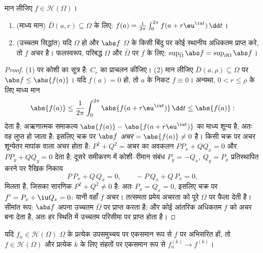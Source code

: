 \begin{theorem}[माध्य मान और उच्चतम मापांक]
\label{thm:b3:holomorphic:maximum}
मान लीजिए $f \in \mathcal H(\Omega)$।
\begin{enumerate}
  \item (माध्य मान) $\bar D(a, r) \subseteq \Omega$ के लिए: $f(a) = \frac1{2\pi}\int_0^{2\pi}f(a +
        r\eu^{\iu t})\,\dd t$।
  \item (उच्चतम सिद्धांत) यदि $\Omega$  हो और $\abs f$ $\Omega$ के
        किसी बिंदु पर कोई स्थानीय अधिकतम प्राप्त करे, तो $f$
        अचर है। फलस्वरूप, परिबद्ध $\Omega$ और $\bar\Omega$ पर  $f$ के
        लिए: $\sup_{\bar\Omega}\abs f =
        \sup_{\partial\Omega}\abs f$।
\end{enumerate}
\end{theorem}

\begin{proof}
(1)  पर कोशी का सूत्र है: $C_r$ का प्राचलन कीजिए।
(2) मान लीजिए $\bar D(a, \rho)
\subseteq \Omega$ पर $\abs f \leq \abs{f(a)}$। यदि $f(a) = 0$ हो, तो $a$ के निकट
$f \equiv 0$। अन्यथा, $0 < r \leq \rho$ के लिए माध्य मान
\[
\abs{f(a)} \leq \frac1{2\pi}\int_0^{2\pi}\abs{f(a +
r\eu^{\iu t})}\,\dd t \leq \abs{f(a)} :
\]
देता है;  अऋणात्मक समाकल्य $\abs{f(a)} - \abs{f(a +
r\eu^{\iu t})}$ का माध्य शून्य है, अतः वह
लुप्त हो जाता है: इसलिए चक्र पर $\abs f$ \emph{अचर} $= \abs{f(a)} \ne 0$ है। किसी
चक्र पर अचर शून्येतर मापांक वाला  अचर होता है:
$P^2 + Q^2 = \text{अचर}$ का अवकलन $PP_x + QQ_x
= 0$ और $PP_y + QQ_y = 0$ देता है; दूसरे समीकरण में
कोशी--रीमान संबंध $P_y = -Q_x$, $Q_y = P_x$ प्रतिस्थापित करने पर रैखिक निकाय
\[
P\,P_x + Q\,Q_x = 0, \qquad -P\,Q_x + Q\,P_x = 0,
\]
मिलता है, जिसका सारणिक $P^2 + Q^2 \neq 0$ है: अतः $P_x = Q_x = 0$, इसलिए चक्र पर $f' = P_x + \iu Q_x = 0$:
यानी वहाँ $f$ अचर। तत्समता प्रमेय अचरता को पूरे $\Omega$ पर फैला
देती है। सीमांत रूप: $\abs f$ अपना उच्चतम  $\bar\Omega$ पर प्राप्त
करता है; और कोई आंतरिक अधिकतम $f$ को अचर बना देता है, अतः हर
स्थिति में उच्चतम परिसीमा पर प्राप्त होता है।
\end{proof}

\begin{theorem}
\label{thm:b3:holomorphic:weierstrassconv}
यदि $f_n \in \mathcal H(\Omega)$ $\Omega$ के प्रत्येक  उपसमुच्चय पर एकसमान रूप से
$f$ पर अभिसरित हों, तो $f \in \mathcal
H(\Omega)$ और प्रत्येक $k$ के लिए संहतों पर
एकसमान रूप से $f_n^{(k)} \to f^{(k)}$।
\end{theorem}

